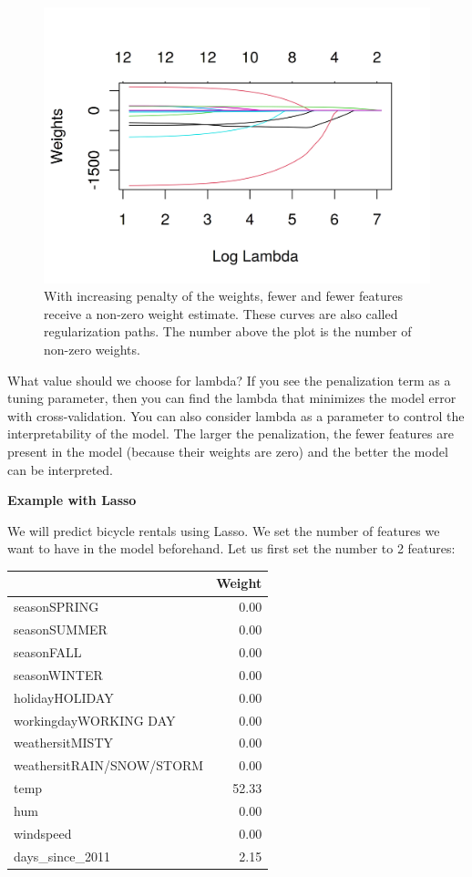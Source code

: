 \documentclass[12pt,]{krantz}
\begin{document}
\begin{figure}

{\centering \includegraphics[width=\textwidth]{images/lasso-path-1} 

}

\caption{With increasing penalty of the weights, fewer and fewer features receive a non-zero weight estimate. These curves are also called regularization paths. The number above the plot is the number of non-zero weights.}\label{fig:lasso-path}
\end{figure}

What value should we choose for lambda? If you see the penalization term
as a tuning parameter, then you can find the lambda that minimizes the
model error with cross-validation. You can also consider lambda as a
parameter to control the interpretability of the model. The larger the
penalization, the fewer features are present in the model (because their
weights are zero) and the better the model can be interpreted.

\textbf{Example with Lasso}

We will predict bicycle rentals using Lasso. We set the number of
features we want to have in the model beforehand. Let us first set the
number to 2 features:

\begin{tabular}{l|r}
\hline
  & Weight\\
\hline
seasonSPRING & 0.00\\
\hline
seasonSUMMER & 0.00\\
\hline
seasonFALL & 0.00\\
\hline
seasonWINTER & 0.00\\
\hline
holidayHOLIDAY & 0.00\\
\hline
workingdayWORKING DAY & 0.00\\
\hline
weathersitMISTY & 0.00\\
\hline
weathersitRAIN/SNOW/STORM & 0.00\\
\hline
temp & 52.33\\
\hline
hum & 0.00\\
\hline
windspeed & 0.00\\
\hline
days\_since\_2011 & 2.15\\
\hline
\end{tabular}
\end{document}
